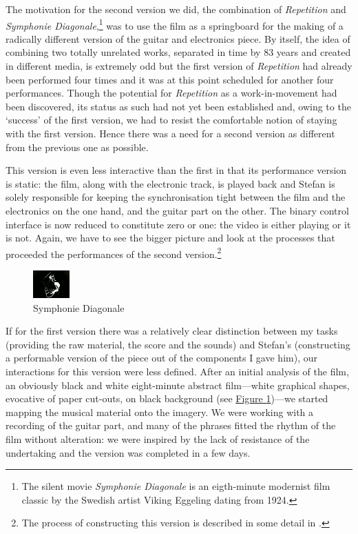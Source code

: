 
The  motivation for the second version we did, the combination of \emph{Repetition} and \emph{Symphonie Diagonale},\footnote{The silent movie \emph{Symphonie Diagonale} is an eigth-minute modernist film classic by the Swedish artist Viking Eggeling dating from 1924.} was to use the film as a springboard for the making of a radically different version of the guitar and electronics piece. By itself, the idea of combining two totally unrelated works, separated in time by 83 years and created in different media, is extremely odd but the first version of \emph{Repetition} had already been performed four times and it was at this point scheduled for another four performances. Though the potential for \emph{Repetition} as a work-in-movement had been discovered, its status as such had not yet been established and, owing to the `success' of the first version, we had to resist the comfortable notion of staying with the first version. Hence there was a need for a second version as different from the previous one as possible. 

\label{sec:4-par:2}
This version is even less interactive than the first in that its performance version is static: the film, along with the electronic track, is played back and Stefan is solely responsible for keeping the synchronisation tight between the film and the electronics on the one hand, and the guitar part on the other. The binary control interface is now reduced to constitute zero or one: the video is either playing or it is not. Again, we have to see the bigger picture and look at the processes that proceeded the performances of the second version.\footnote{The process of constructing this version is described in some detail in \cite{ostersjo08}.}

\begin{figure}
  \begin{center}
    \includegraphics{img/eggeling-25}
  \end{center}
    \caption{Symphonie Diagonale}
    \label{fig:eggeling-25}
 \end{figure}
\label{sec:4-par:3}
If for the first version there was a relatively clear distinction between my tasks (providing the raw material, the score and the sounds) and Stefan's (constructing a performable version of the piece out of the components I gave him), our interactions for this version were less defined. After an initial analysis of the film, an obviously black and white eight-minute abstract film---white graphical shapes, evocative of paper cut-outs, on black background (see \hyperref[fig:eggeling-25]{Figure \ref*{fig:eggeling-25}})---we started mapping the musical material onto the imagery. We were working with a recording of the guitar part, and many of the phrases fitted the rhythm of the film without alteration: we were inspired by the lack of resistance of the undertaking and the version was completed in a few days. 

